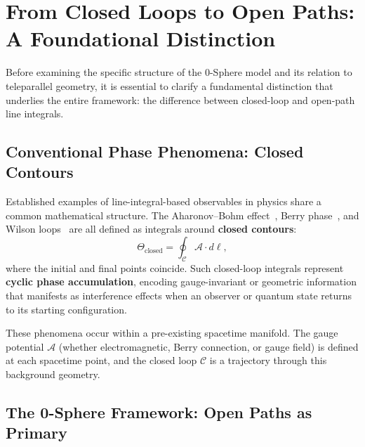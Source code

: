 \documentclass[12pt,letterpaper]{article}
\begin{document}
\section{From Closed Loops to Open Paths: A Foundational Distinction}

\justifying
Before examining the specific structure of the 0-Sphere model and its relation to teleparallel geometry, it is essential to clarify a fundamental distinction that underlies the entire framework: the difference between closed-loop and open-path line integrals.

\subsection{Conventional Phase Phenomena: Closed Contours}

Established examples of line-integral-based observables in physics share a common mathematical structure. The Aharonov--Bohm effect~\cite{ABEffect}, Berry phase~\cite{Berry1984}, and Wilson loops~\cite{WilsonLoop} are all defined as integrals around \textbf{closed contours}:
\begin{equation}
\Theta_{\mathrm{closed}} = \oint_{\mathcal{C}} \mathcal{A} \cdot d\bm{\ell},
\end{equation}
where the initial and final points coincide. Such closed-loop integrals represent \textbf{cyclic phase accumulation}, encoding gauge-invariant or geometric information that manifests as interference effects when an observer or quantum state returns to its starting configuration.

These phenomena occur within a pre-existing spacetime manifold. The gauge potential $\mathcal{A}$ (whether electromagnetic, Berry connection, or gauge field) is defined at each spacetime point, and the closed loop $\mathcal{C}$ is a trajectory through this background geometry.

\subsection{The 0-Sphere Framework: Open Paths as Primary}
\end{document}
